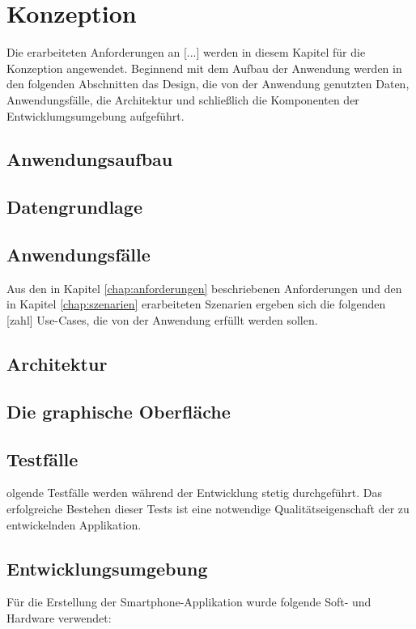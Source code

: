 \chapter{\label{chap:konzeption}Konzeption}
Die erarbeiteten Anforderungen an [...] werden in diesem Kapitel für die Konzeption angewendet. Beginnend mit dem Aufbau der Anwendung werden in den folgenden Abschnitten das Design, die von der Anwendung genutzten Daten, Anwendungsfälle, die Architektur und schließlich die Komponenten der Entwicklumgsumgebung aufgeführt.
\section{Anwendungsaufbau}
\section{Datengrundlage}

\section{Anwendungsfälle}
Aus den in Kapitel \ref{chap:anforderungen} beschriebenen Anforderungen und den in Kapitel \ref{chap:szenarien} erarbeiteten Szenarien ergeben sich die folgenden [zahl] Use-Cases, die von der Anwendung erfüllt werden sollen.\\

\section{Architektur}
\section{Die graphische Oberfläche}

\section{Testfälle}
olgende Testfälle werden während der Entwicklung stetig durchgeführt. Das erfolgreiche Bestehen dieser Tests ist eine notwendige Qualitätseigenschaft der zu entwickelnden Applikation.


%
%
\clearpage
\section{Entwicklungsumgebung}
Für die Erstellung der Smartphone-Applikation wurde folgende Soft- und Hardware verwendet:
